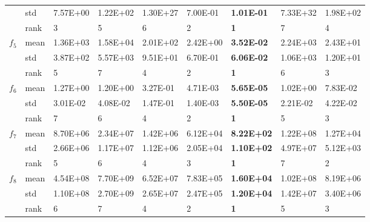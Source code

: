 \documentclass[a4paper,13pt,2p]{report}
\begin{document}
\begin{table}[!t]
\begin{tabular}{|l|l|l|l|l|l|l|l|l|}
                     & std  & 7.57E+00 & 1.22E+02 & 1.30E+27 & 7.00E-01          & \textbf{1.01E-01}  & 7.33E+32 & 1.98E+02          \\ \cline{2-9} 
                     & rank & 3        & 5        & 6        & 2                 & \textbf{1}         & 7        & 4                 \\ \hline
\multirow{3}{*}{$f_5$}  & mean & 1.36E+03 & 1.58E+04 & 2.01E+02 & 2.42E+00          & \textbf{3.52E-02}  & 2.24E+03 & 2.43E+01          \\ \cline{2-9} 
                     & std  & 3.87E+02 & 5.57E+03 & 9.51E+01 & 6.70E-01          & \textbf{6.06E-02}  & 1.06E+03 & 1.20E+01          \\ \cline{2-9} 
                     & rank & 5        & 7        & 4        & 2                 & \textbf{1}         & 6        & 3                 \\ \hline
\multirow{3}{*}{$f_6$}  & mean & 1.27E+00 & 1.20E+00 & 3.27E-01 & 4.71E-03          & \textbf{5.65E-05}  & 1.02E+00 & 7.83E-02          \\ \cline{2-9} 
                     & std  & 3.01E-02 & 4.08E-02 & 1.47E-01 & 1.40E-03          & \textbf{5.50E-05}  & 2.21E-02 & 4.22E-02          \\ \cline{2-9} 
                     & rank & 7        & 6        & 4        & 2                 & \textbf{1}         & 5        & 3                 \\ \hline
\multirow{3}{*}{$f_7$}  & mean & 8.70E+06 & 2.34E+07 & 1.42E+06 & 6.12E+04          & \textbf{8.22E+02}  & 1.22E+08 & 1.27E+04          \\ \cline{2-9} 
                     & std  & 2.66E+06 & 1.17E+07 & 1.12E+06 & 2.05E+04          & \textbf{1.10E+02}  & 4.97E+07 & 5.12E+03          \\ \cline{2-9} 
                     & rank & 5        & 6        & 4        & 3                 & \textbf{1}         & 7        & 2                 \\ \hline
\multirow{3}{*}{$f_8$}  & mean & 4.54E+08 & 7.70E+09 & 6.52E+07 & 7.83E+05          & \textbf{1.60E+04}  & 1.02E+08 & 8.19E+06          \\ \cline{2-9} 
                     & std  & 1.10E+08 & 2.70E+09 & 2.65E+07 & 2.47E+05          & \textbf{1.20E+04}  & 1.42E+07 & 3.40E+06          \\ \cline{2-9} 
                     & rank & 6        & 7        & 4        & 2                 & \textbf{1}         & 5        & 3                 \\ \hline

\end{tabular}
\end{table}
\end{document}
